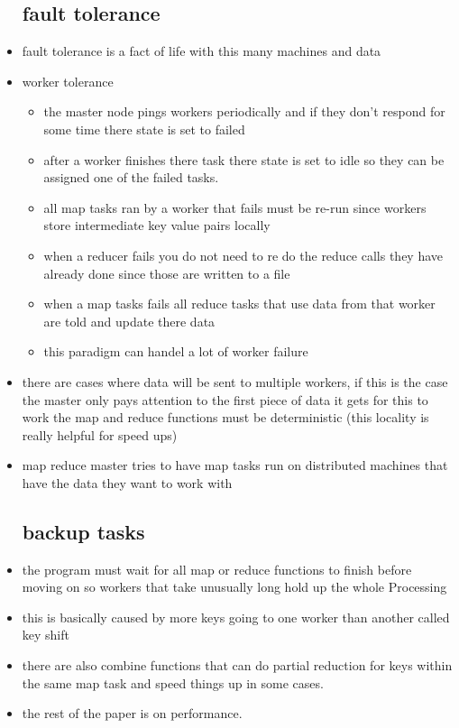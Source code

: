 \documentclass{article}
\begin{document}
\begin{itemize}
    \subsection*{fault tolerance}
    \item fault tolerance is a fact of life with this many machines and data 
    \item worker tolerance
     \begin{itemize}
        \item the master node pings workers periodically and if they don't respond for some time there state is set to failed 
        \item after a worker finishes there task there state is set to idle so they can be assigned one of the failed tasks. 
        \item all map tasks ran by a worker that fails must be re-run since workers store intermediate key value pairs locally
        \item when a reducer fails you do not need to re do the reduce calls they have already done since those are written to a file 
        \item when a map tasks fails all reduce tasks that use data from that worker are told and update there data 
        \item this paradigm can handel a lot of worker failure
    \end{itemize}
    \item there are cases where data will be sent to multiple workers, if this is the case the master only pays attention to the first piece of data it gets for this to work the map and reduce functions must be deterministic (this locality is really helpful for speed ups)
    \item map reduce master tries to have map tasks run on distributed machines that have the data they want to work with 
    \subsection*{backup tasks}
    \item the program must wait for all map or reduce functions to finish before moving on so workers that take unusually long hold up the whole Processing
    \item this is basically caused by more keys going to one worker than another called key shift
    \item there are also combine functions that can do partial reduction for keys within the same map task and speed things up in some cases.
    \item the rest of the paper is on performance. 
\end{itemize}
\end{document}
